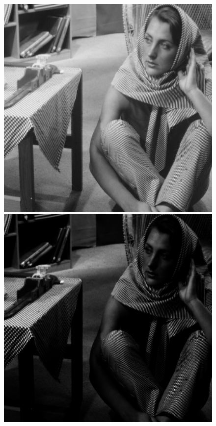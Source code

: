 \documentclass{article}
\begin{document}
\begin{figure}[!htb]
\centering
\includegraphics[scale=0.2]{img/barbara_8bit.png} 
\includegraphics[scale=0.2]{img/Potegowanie_Obrazu_barbara_8bit.png}\\

\end{figure}
\end{document}
